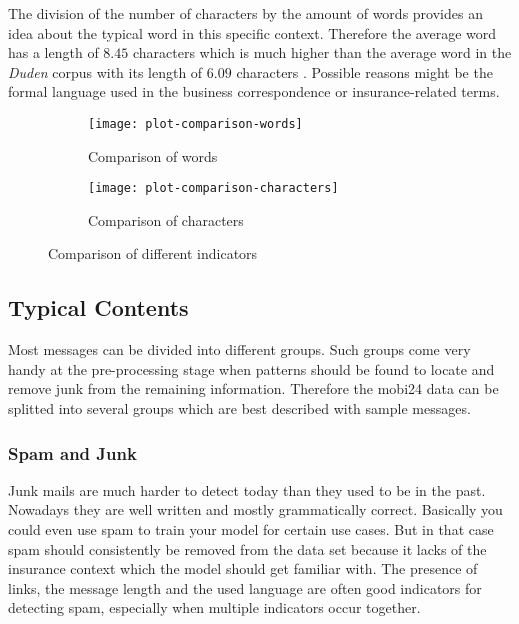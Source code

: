 The division of the number of characters by the amount of words provides an idea about the typical word in this specific context.
Therefore the average word has a length of $8.45$ characters which is much higher than the average word in the \emph{\Gls{Duden}}
corpus with its length of $6.09$ characters \cite{duden}. Possible reasons might be the formal language used in the business
correspondence or insurance-related terms.

\begin{figure}[!ht]
    \begin{subfigure}{0.5\textwidth}
        \texttt{[image: plot-comparison-words]} 
        \caption{Comparison of words}
        \label{fig:plot-comparison-words}
    \end{subfigure}
    \begin{subfigure}{0.5\textwidth}
        \texttt{[image: plot-comparison-characters]}
        \caption{Comparison of characters}
        \label{fig:plot-comparison-characters}
    \end{subfigure}
    \caption{Comparison of different indicators}
\end{figure}

\subsection{Typical Contents}
\label{chap:typical-contents}
Most messages can be divided into different groups. Such groups come very handy at the pre-processing stage when patterns should be
found to locate and remove junk from the remaining information. Therefore the mobi24 data can be splitted into several groups which
are best described with sample messages.

\subsubsection{Spam and Junk}

Junk mails are much harder to detect today than they used to be in the past. Nowadays they are well written and mostly grammatically
correct. Basically you could even use spam to train your model for certain use cases. But in that case spam should consistently be
removed from the data set because it lacks of the insurance context which the model should get familiar with. The presence of links,
the message length and the used language are often good indicators for detecting spam, especially when multiple indicators occur together.

